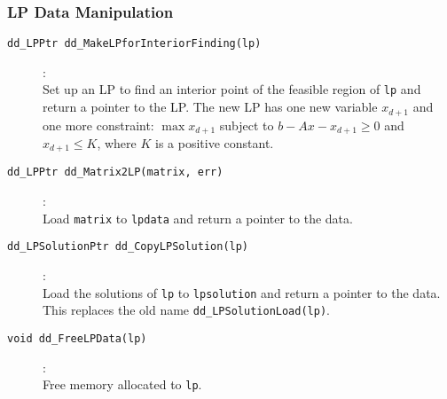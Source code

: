 \documentclass[11pt]{article}
\newcommand {\0} {{\bf 0}}
\begin{document}
\subsubsection{LP Data Manipulation}
\begin{description}

\item[{\tt dd\_LPPtr dd\_MakeLPforInteriorFinding(lp)}]:\\
Set up an LP to find an interior point of the feasible region of {\tt lp}
and return a pointer to the LP.  The new LP has one new variable
$x_{d+1}$ and one more constraint:
$\max x_{d+1}$ subject to $b - A x - x_{d+1} \ge 0$ and $x_{d+1} \le K$,
where $K$ is a positive constant.

\item[{\tt dd\_LPPtr dd\_Matrix2LP(matrix, err)}]:\\
Load {\tt matrix} to {\tt lpdata} and return a pointer to the data.

\item[{\tt dd\_LPSolutionPtr dd\_CopyLPSolution(lp)}]:\\
Load the solutions of {\tt lp} to {\tt lpsolution} and
return a pointer to the data.  This replaces the old name
{\tt dd\_LPSolutionLoad(lp)}.

\item[{\tt void dd\_FreeLPData(lp)}]:\\
Free memory allocated to {\tt lp}.

\end{description}
\end{document}
